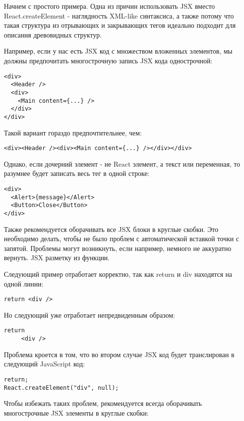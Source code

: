Начнем с простого примера. Одна из причин использовать JSX вместо React.createElement - наглядность XML-like синтаксиса, а также потому что такая структура из отрывающих и закрывающих тегов идеально подходит для описания древовидных структур.

Например, если у нас есть JSX код с множеством вложенных элементов, мы должны предпочитать многострочную запись JSX кода однострочной:

\begin{lstlisting}
<div>
  <Header />
  <div>
    <Main content={...} />
  </div>
</div>
\end{lstlisting}

Такой вариант гораздо предпочтительнее, чем:

\begin{lstlisting}
<div><Header /><div><Main content={...} /></div></div>
\end{lstlisting}

Однако, если дочерний элемент - не React элемент, а текст или переменная, то разумнее будет записать весь тег в одной строке:

\begin{lstlisting}
<div>
  <Alert>{message}</Alert>
  <Button>Close</Button>
</div>
\end{lstlisting}

Также рекомендуется оборачивать все JSX блоки в круглые скобки. Это необходимо делать, чтобы не было проблем с автоматической вставкой точки с запятой. Проблемы могут возникнуть, если например, немного не аккуратно вернуть. JSX разметку из функции.

Следующий пример отработает корректно, так как return и div находятся на одной линии:

\begin{lstlisting}
return <div />
\end{lstlisting}

Но следующий уже отработает непредвиденным образом:

\begin{lstlisting}
return
     <div />
\end{lstlisting}
     
Проблема кроется в том, что во втором случае JSX код будет транслирован в следующий JavaScript код:

\begin{lstlisting}
return;
React.createElement("div", null);
\end{lstlisting}
   
Чтобы избежать таких проблем, рекомендуется всегда оборачивать многострочные JSX элементы в круглые скобки:

